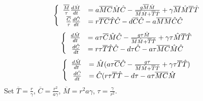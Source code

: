 {\center
\begin{frame}$$\begin{cases}
\begin{array}{rl}
\frac{\overline{M}}{\tau}\frac{d\HAT{M}}{dt}&= a\overline{M}\overline{C}\HAT{M}\HAT{C}-\frac{g\overline{M}\HAT{M}}{\overline{M}\HAT{M}+\overline{T}\HAT{T}} + \gamma \overline{M}\HAT{M}\overline{T}\HAT{T}\\ 
\frac{\overline{C}}{\tau}\frac{d\HAT{C}}{dt}&=r\overline{T}\overline{C}\HAT{T}\HAT{C}-d\overline{C}\HAT{C}-a\overline{M}\overline{M}\HAT{C}\HAT{C}
\end{array} \end{cases}$$$$\begin{cases}
\begin{array}{rl}
\frac{d\HAT{M}}{dt}&= a\tau\overline{C}\HAT{M}\HAT{C}-\frac{g\tau\HAT{M}}{\overline{M}\HAT{M}+\overline{T}\HAT{T}} + \gamma \tau\HAT{M}\overline{T}\HAT{T}\\ 
\frac{d\HAT{C}}{dt}&=r\tau\overline{T}\HAT{T}\HAT{C}-d\tau\HAT{C}-a\tau\overline{M}\overline{C}\HAT{M}\HAT{C}
\end{array} \end{cases}$$$$\begin{cases}
\begin{array}{rl}
\frac{d\HAT{M}}{dt}&= \HAT{M}(a\tau\overline{C}\HAT{C}-\frac{g\tau}{\overline{M}\HAT{M}+\overline{T}\HAT{T}} + \gamma \tau\overline{T}\HAT{T})\\ 
\frac{d\HAT{C}}{dt}&=\HAT{C}(r\tau\overline{T}\HAT{T}-d\tau-a\tau\overline{M}\overline{C}\HAT{M}
\end{array} \end{cases}$$ Set $\overline{T}=\frac{r}{\gamma}$, $\overline{C}=\frac{r^2}{a\gamma}$, $\overline{M}={r^2}{a\gamma}$, $\tau=\frac{\gamma}{r^2}$.
\end{frame}
}
